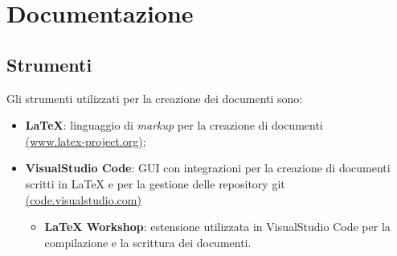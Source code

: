 \section{Documentazione}
\subsection{Strumenti}
Gli strumenti utilizzati per la creazione dei documenti sono:
\begin{itemize}
    \item \textbf{LaTeX}: linguaggio di \textit{markup} per la creazione di documenti \\
        \href{https://www.latex-project.org/}{(www.latex-project.org)};
    \item \textbf{VisualStudio Code}: GUI con integrazioni per la creazione di documenti scritti in LaTeX e per la gestione delle repository git \\
        \href{https://code.visualstudio.com/}{(code.visualstudio.com)}
        \begin{itemize}
            \item \textbf{LaTeX Workshop}: estensione utilizzata in VisualStudio Code per la compilazione e la scrittura dei documenti.
        \end{itemize}
\end{itemize}


